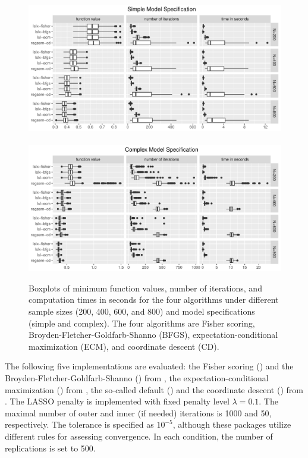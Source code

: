 \documentclass[nojss]{jss}
\begin{document}
\begin{figure}[t!]
\centering
\includegraphics[width=6in]{vignette-lslx-figure-5a.pdf}
\\~\\
\includegraphics[width=6in]{vignette-lslx-figure-5b.pdf}
\caption{\label{fig:comparison} Boxplots of minimum function values, number of iterations, and computation times in seconds for the four algorithms under different sample sizes (200, 400, 600, and 800) and model specifications (simple and complex). The four algorithms are Fisher scoring, Broyden-Fletcher-Goldfarb-Shanno (BFGS), expectation-conditional maximization (ECM), and coordinate descent (CD).}
\end{figure}




The following five implementations are evaluated: the Fisher scoring () and the Broyden-Fletcher-Goldfarb-Shanno () from , the expectation-conditional maximization () from , the so-called default () and the coordinate descent () from . The LASSO penalty is implemented with fixed penalty level $\lambda = 0.1$. The maximal number of outer and inner (if needed) iterations is 1000 and 50, respectively. The tolerance is specified as $10^{-5}$, although these packages utilize different rules for assessing convergence. In each condition, the number of replications is set to 500. 
\end{document}

